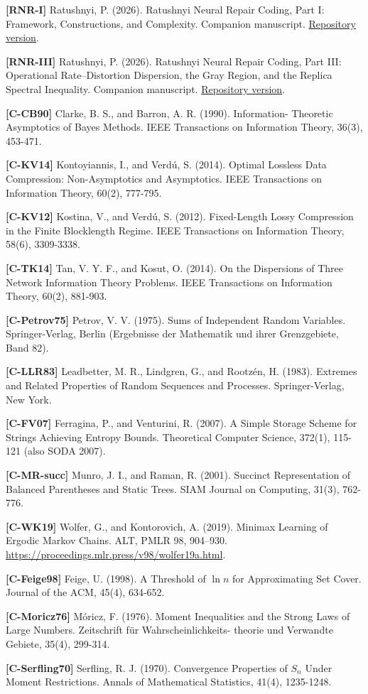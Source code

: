 \documentclass[
]{article}
\begin{document}
\textbf{[RNR-I]} Ratushnyi, P. (2026). Ratushnyi Neural Repair Coding,
Part I: Framework, Constructions, and Complexity.
Companion manuscript. \href{https://github.com/ratushnyi-labs/sci-rnr/blob/b89507a8f3fe11f34ff931c8081d2b0507695041/tex/papers/core/rnr_core.tex}{Repository version}.

\textbf{[RNR-III]} Ratushnyi, P. (2026). Ratushnyi Neural Repair Coding,
Part III: Operational Rate--Distortion Dispersion, the Gray Region, and the Replica Spectral Inequality.
Companion manuscript. \href{https://github.com/ratushnyi-labs/sci-rnr/blob/b89507a8f3fe11f34ff931c8081d2b0507695041/tex/papers/dispersion/rnr_dispersion.tex}{Repository version}.

\textbf{[C-CB90]} Clarke, B. S., and Barron, A. R. (1990). Information-
Theoretic Asymptotics of Bayes Methods. IEEE Transactions on Information
Theory, 36(3), 453-471.

\textbf{[C-KV14]} Kontoyiannis, I., and Verd\'u, S. (2014). Optimal
Lossless Data Compression: Non-Asymptotics and Asymptotics. IEEE
Transactions on Information Theory, 60(2), 777-795.

\textbf{[C-KV12]} Kostina, V., and Verd\'u, S. (2012). Fixed-Length Lossy
Compression in the Finite Blocklength Regime. IEEE Transactions on
Information Theory, 58(6), 3309-3338.

\textbf{[C-TK14]} Tan, V. Y. F., and Kosut, O. (2014). On the Dispersions
of Three Network Information Theory Problems. IEEE Transactions on
Information Theory, 60(2), 881-903.

\textbf{[C-Petrov75]} Petrov, V. V. (1975). Sums of Independent Random
Variables. Springer-Verlag, Berlin (Ergebnisse der Mathematik und ihrer
Grenzgebiete, Band 82).

\textbf{[C-LLR83]} Leadbetter, M. R., Lindgren, G., and Rootz\'en, H.
(1983). Extremes and Related Properties of Random Sequences and Processes.
Springer-Verlag, New York.

\textbf{[C-FV07]} Ferragina, P., and Venturini, R. (2007). A Simple
Storage Scheme for Strings Achieving Entropy Bounds. Theoretical Computer
Science, 372(1), 115-121 (also SODA 2007).

\textbf{[C-MR-succ]} Munro, J. I., and Raman, R. (2001). Succinct
Representation of Balanced Parentheses and Static Trees. SIAM Journal on
Computing, 31(3), 762-776.

\textbf{[C-WK19]} Wolfer, G., and Kontorovich, A.
(2019). Minimax Learning of Ergodic Markov Chains. ALT, PMLR 98, 904--930.
\url{https://proceedings.mlr.press/v98/wolfer19a.html}.

\textbf{[C-Feige98]} Feige, U. (1998). A Threshold of $\ln n$ for
Approximating Set Cover. Journal of the ACM, 45(4), 634-652.

\textbf{[C-Moricz76]} M\'oricz, F. (1976). Moment Inequalities and the
Strong Laws of Large Numbers. Zeitschrift f\"ur Wahrscheinlichkeits-
theorie und Verwandte Gebiete, 35(4), 299-314.

\textbf{[C-Serfling70]} Serfling, R. J. (1970). Convergence Properties of
$S_n$ Under Moment Restrictions. Annals of Mathematical Statistics, 41(4),
1235-1248.
\end{document}
